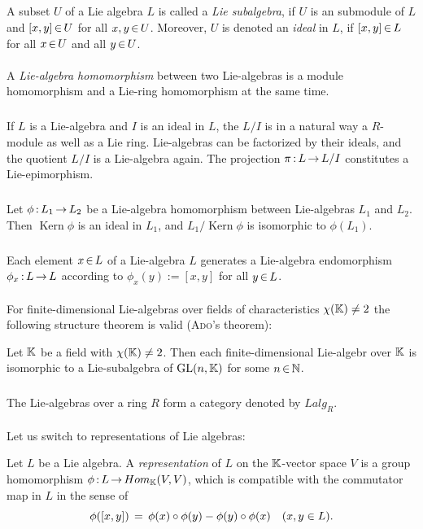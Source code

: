 \documentclass[11pt,twoside]{article}
\begin{document}
\subparagraph{}
A subset $U$ of a Lie algebra $L$ is called a \textit{Lie subalgebra},
if $U$ is an submodule of $L$ and $[x,y] \xeof U$ for all $x,y \xeof U$.
Moreover,
$U$ is denoted an \textit{ideal} in $L$,
if $[x,y] \xeof L$ for all $x \xeof U$ and all $y \xeof U$.

\paragraph{}
A \textit{Lie-algebra homomorphism} between two Lie-algebras is
a module homomorphism and a Lie-ring homomorphism at the same time.

\subparagraph{}
If $L$ is a Lie-algebra and $I$ is an ideal in $L$,
the $L/I$ is in a natural way a $R$-module as well as a Lie ring.
Lie-algebras can be factorized by their ideals,
and the quotient $L/I$ is a Lie-algebra again.
The projection $\pi \: L \xto L/I$ constitutes a Lie-epimorphism.

\subparagraph{}
Let $\phi \:L_1 \xto L_2$ be a Lie-algebra homomorphism between
Lie-algebras $L_1$ and $L_2$.
Then $\operatorname{Kern} \phi$ is an ideal in $L_1$,
and $L_1 / \operatorname{Kern} \phi$ is isomorphic to $\phi(L_1)$.

\subparagraph{}
Each element $x \xeof L$ of a Lie-algebra $L$ generates
a Lie-algebra endomorphism $\phi_x \: L \xto L$
according to $\phi_x(y) := [x,y]$ for all $y \xeof L$.

\paragraph{}
For finite-dimensional Lie-algebras over fields of characteristics
$\chi(\F) \neq 2$ the following structure theorem is valid (\textsc{Ado}'s theorem):

\begin{theorem}
Let $\F$ be a field with $\chi(\F) \neq 2$.
Then each finite-dimensional Lie-algebr over $\F$ is isomorphic
to a Lie-subalgebra of $\operatorname{GL}(n,\F)$ for some $n \xeof \N$.
\end{theorem}

\subparagraph{}
The Lie-algebras over a ring $R$ form a category denoted by $Lalg_R$.

\paragraph{}
Let us switch to representations of Lie algebras:

\begin{definition}
Let $L$ be a Lie algebra.
A \textit{representation} of $L$ on the $\F$-vector space $V$
is a
group homomorphism $\phi \: L \xto Hom_{\F}(V,V)$,
which is compatible with the commutator map in $L$ in the sense of
\[
\phi([x,y]) \= \phi(x) \circ \phi(y) - \phi(y) \circ \phi(x) \quad (x,y \in L).
\]
\end{definition}
\end{document}
